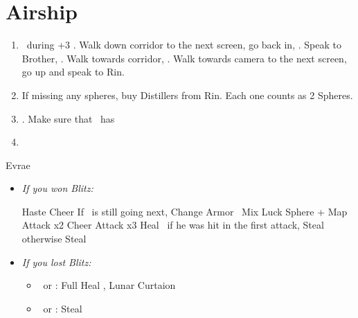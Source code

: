 \chapter{Airship}

\begin{enumerate}
	\item \sd\ during \cs+3 \skippablefmv. Walk down corridor to the next screen, go back in, \sd. Speak to Brother, \sd. Walk towards corridor, \sd. Walk towards camera to the next screen, go up and speak to Rin.
	\item If missing any spheres, buy Distillers from Rin. Each one counts as 2 Spheres.
	\item \save. Make sure that \rikku\ has \od
	\item \formation{\tidus}{\rikku}{\kimahri}
\end{enumerate}
\begin{battle}[32000]{Evrae}
	\begin{itemize}
	\item \textit{If you won Blitz:}
	\begin{itemize}
		\tidusf Haste \tidus
		\tidusf Cheer
		\tidusf If \tidus\ is still going next, Change Armor
		\rikkuf \od\ Mix Luck Sphere + Map
		\tidusf Attack x2
		\tidusf Cheer
		\tidusf Attack x3
		\kimahrif Heal \tidus\ if he was hit in the first attack, Steal otherwise
		\rikkuf Steal
	\end{itemize}
	\item \textit{If you lost Blitz:}
	\begin{itemize}
		\tidusf Haste \tidus
		\tidusf Cheer x2
		\tidusf Equip Baroque Sword
		\tidusf Attack x6
		\rikkuf \od\ Mix Luck Sphere + Map
		\item \kimahri\ or \rikku: Full Heal \tidus, Lunar Curtaion \tidus
		\item \kimahri\ or \rikku: Steal
	\end{itemize}
\end{itemize}
\end{battle}